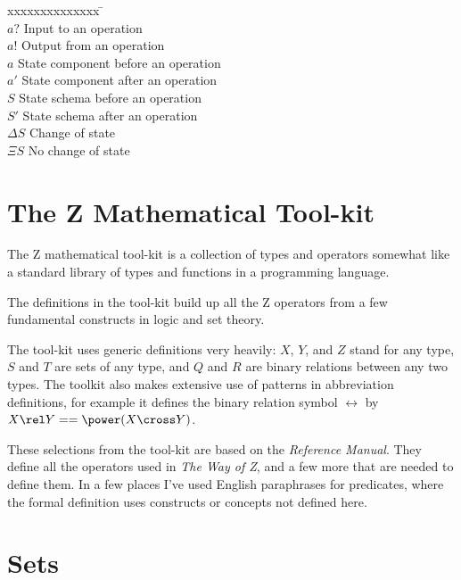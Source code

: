 \documentclass{article}
\begin{document}
\begin{tabbing}
xxxxxxxxxxxxxx \= \kill \\ 
$a?$ \> Input to an operation \\
$a!$ \> Output from an operation \\
$a$ \> State component before an operation \\
$a'$ \> State component after an operation \\
$S$ \> State schema before an operation \\
$S'$ \> State schema after an operation \\
$\Delta S$ \> Change of state \\
$\Xi S$ \> No change of state \\
\end{tabbing}












\section{The Z Mathematical Tool-kit} \label{ch:toolkit}

The Z mathematical tool-kit is a collection of types and operators
somewhat like a standard library of types and functions in a
programming language.

The definitions in the tool-kit build up all the Z operators from
a few fundamental constructs in logic and set theory.

The tool-kit uses generic definitions very heavily: $X$, $Y$, and $Z$
stand for any type, $S$ and $T$ are sets of any type, and $Q$ and $R$
are binary relations between any two types.  The toolkit also makes
extensive use of patterns in abbreviation definitions, for example it
defines the binary relation symbol $\rel$ by $X \rel Y == \power (X \cross Y)$.

These selections from the tool-kit are based on the 
{\em Reference Manual}.  They define all the operators used in 
{\em The Way of Z}, and a few more that are needed to define them.
In a few places I've used English paraphrases for predicates, where
the formal definition uses constructs or concepts not defined here.

\newpage

\section*{Sets}
\end{document}

